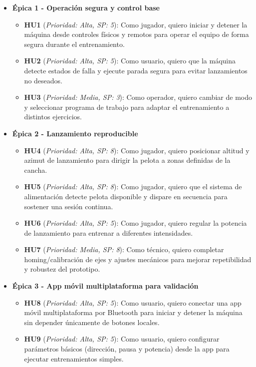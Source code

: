 ﻿\documentclass[
11pt, %
]{charter}
\begin{document}
\begin{itemize}
  \item \textbf{\'{E}pica 1 - Operación segura y control base}
    \begin{itemize}
      \item \textbf{HU1} (\textit{Prioridad: Alta, SP: 5}): Como jugador, quiero iniciar y detener la máquina desde controles físicos y remotos para operar el equipo de forma segura durante el entrenamiento.
      \item \textbf{HU2} (\textit{Prioridad: Alta, SP: 5}): Como usuario, quiero que la máquina detecte estados de falla y ejecute parada segura para evitar lanzamientos no deseados.
      \item \textbf{HU3} (\textit{Prioridad: Media, SP: 3}): Como operador, quiero cambiar de modo y seleccionar programa de trabajo para adaptar el entrenamiento a distintos ejercicios.
    \end{itemize}
  \item \textbf{\'{E}pica 2 - Lanzamiento reproducible}
    \begin{itemize}
      \item \textbf{HU4} (\textit{Prioridad: Alta, SP: 8}): Como jugador, quiero posicionar altitud y azimut de lanzamiento para dirigir la pelota a zonas definidas de la cancha.
      \item \textbf{HU5} (\textit{Prioridad: Alta, SP: 8}): Como jugador, quiero que el sistema de alimentación detecte pelota disponible y dispare en secuencia para sostener una sesión continua.
      \item \textbf{HU6} (\textit{Prioridad: Alta, SP: 5}): Como jugador, quiero regular la potencia de lanzamiento para entrenar a diferentes intensidades.
      \item \textbf{HU7} (\textit{Prioridad: Media, SP: 8}): Como técnico, quiero completar homing/calibración de ejes y ajustes mecánicos para mejorar repetibilidad y robustez del prototipo.
    \end{itemize}
  \item \textbf{\'{E}pica 3 - App móvil multiplataforma para validación}
    \begin{itemize}
      \item \textbf{HU8} (\textit{Prioridad: Alta, SP: 5}): Como usuario, quiero conectar una app móvil multiplataforma por Bluetooth para iniciar y detener la máquina sin depender únicamente de botones locales.
      \item \textbf{HU9} (\textit{Prioridad: Alta, SP: 5}): Como usuario, quiero configurar parámetros básicos (dirección, pausa y potencia) desde la app para ejecutar entrenamientos simples.

\end{itemize}
\end{itemize}
\end{document}
